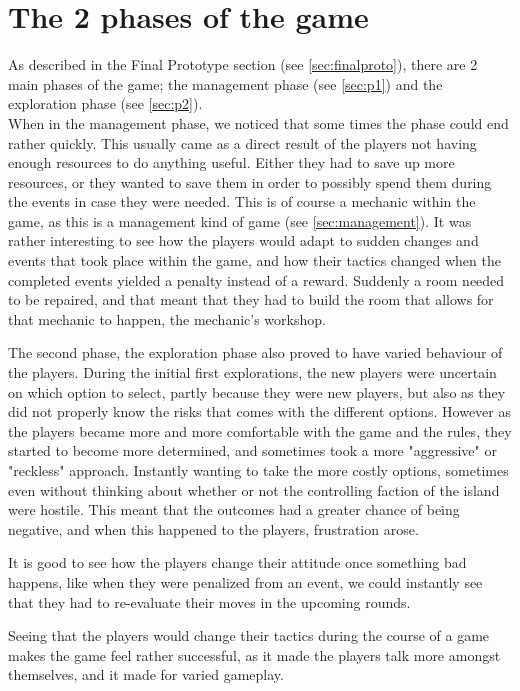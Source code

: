 \section{The 2 phases of the game}

As described in the Final Prototype section (see \ref{sec:finalproto}), there are 2 main phases of the game; the management phase (see \ref{sec:p1}) and the exploration phase (see \ref{sec:p2}).\\When in the management phase, we noticed that some times the phase could end rather quickly. This usually came as a direct result of the players not having enough resources to do anything useful. Either they had to save up more resources, or they wanted to save them in order to possibly spend them during the events in case they were needed. This is of course a mechanic within the game, as this is a management kind of game (see \ref{sec:management}). It was rather interesting to see how the players would adapt to sudden changes and events that took place within the game, and how their tactics changed when the completed events yielded a penalty instead of a reward. Suddenly a room needed to be repaired, and that meant that they had to build the room that allows for that mechanic to happen, the mechanic's workshop.

The second phase, the exploration phase also proved to have varied behaviour of the players. During the initial first explorations, the new players were uncertain on which option to select, partly because they were new players, but also as they did not properly know the risks that comes with the different options. However as the players became more and more comfortable with the game and the rules, they started to become more determined, and sometimes took a more "aggressive" or "reckless" approach. Instantly wanting to take the more costly options, sometimes even without thinking about whether or not the controlling faction of the island were hostile. This meant that the outcomes had a greater chance of being negative, and when this happened to the players, frustration arose. 

It is good to see how the players change their attitude once something bad happens, like when they were penalized from an event, we could instantly see that they had to re-evaluate their moves in the upcoming rounds. 

Seeing that the players would change their tactics during the course of a game makes the game feel rather successful, as it made the players talk more amongst themselves, and it made for varied gameplay.

